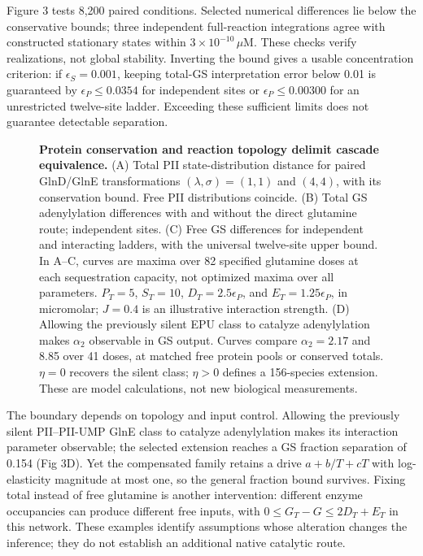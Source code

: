 \documentclass[10pt,letterpaper]{article}
\begin{document}
Figure 3 tests 8,200 paired conditions. Selected numerical differences lie below the conservative bounds; three independent full-reaction integrations agree with constructed stationary states within $3\times10^{-10}\,\mu$M. These checks verify realizations, not global stability. Inverting the bound gives a usable concentration criterion: if $\epsilon_S=0.001$, keeping total-GS interpretation error below 0.01 is guaranteed by $\epsilon_P\leq0.0354$ for independent sites or $\epsilon_P\leq0.00300$ for an unrestricted twelve-site ladder. Exceeding these sufficient limits does not guarantee detectable separation.

\begin{figure}[!ht]\centering
\begin{singlespace}\caption{\textbf{Protein conservation and reaction topology delimit cascade equivalence.} (A) Total PII state-distribution distance for paired GlnD/GlnE transformations $(\lambda,\sigma)=(1,1)$ and $(4,4)$, with its conservation bound. Free PII distributions coincide. (B) Total GS adenylylation differences with and without the direct glutamine route; independent sites. (C) Free GS differences for independent and interacting ladders, with the universal twelve-site upper bound. In A--C, curves are maxima over 82 specified glutamine doses at each sequestration capacity, not optimized maxima over all parameters. $P_T=5$, $S_T=10$, $D_T=2.5\epsilon_P$, and $E_T=1.25\epsilon_P$, in micromolar; $J=0.4$ is an illustrative interaction strength. (D) Allowing the previously silent EPU class to catalyze adenylylation makes $\alpha_2$ observable in GS output. Curves compare $\alpha_2=2.17$ and 8.85 over 41 doses, at matched free protein pools or conserved totals. $\eta=0$ recovers the silent class; $\eta>0$ defines a 156-species extension. These are model calculations, not new biological measurements.}\end{singlespace}\end{figure}

The boundary depends on topology and input control. Allowing the previously silent PII--PII-UMP GlnE class to catalyze adenylylation makes its interaction parameter observable; the selected extension reaches a GS fraction separation of 0.154 (Fig 3D). Yet the compensated family retains a drive $a+b/T+cT$ with log-elasticity magnitude at most one, so the general fraction bound survives. Fixing total instead of free glutamine is another intervention: different enzyme occupancies can produce different free inputs, with $0\leq G_T-G\leq2D_T+E_T$ in this network. These examples identify assumptions whose alteration changes the inference; they do not establish an additional native catalytic route.
\end{document}
